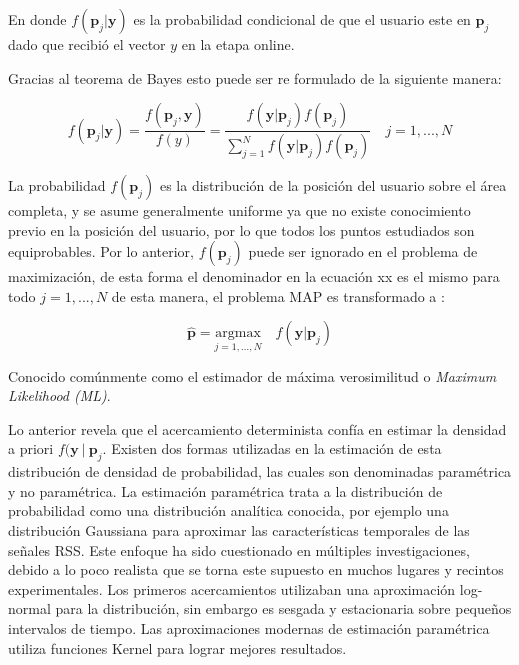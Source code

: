 \begin{enumerate}
 En donde \( f( \textbf{p}_{j} \vert \textbf{y}) \) es la probabilidad condicional de que el usuario este en \(\textbf{p}_{j}\) dado que recibió el vector \( y \) en la etapa online.
 
Gracias al teorema de Bayes esto puede ser re formulado de la siguiente manera:

\begin{equation}
 f( \textbf{p}_{j} \vert \textbf{y}) = \frac{f( \textbf{p}_{j} , \textbf{y})}{f(y)} = \frac{f( \textbf{y} \vert \textbf{p}_{j}) f(\textbf{p}_{j})} {\sum_{j=1}^{N} f( \textbf{y} \vert \textbf{p}_{j}) f(\textbf{p}_{j})} \quad j = 1, ..., N 
\end{equation}

La probabilidad \(f(\textbf{p}_{j})\) es la distribución de la posición del usuario sobre el área completa, y se asume generalmente uniforme ya que no existe conocimiento previo en la posición del usuario, por lo que todos los puntos estudiados son equiprobables. Por lo anterior, \(f(\textbf{p}_{j})\) puede ser ignorado en el problema de maximización, de esta forma el denominador en la ecuación xx es el mismo para todo \( j= 1, ..., N\) de esta manera, el problema MAP es transformado a :

\begin{equation}
\hat{\textbf{p}} = \underset{j=1,...,N}{\mathrm{argmax}} \quad f( \textbf{y}  \vert \textbf{p}_{j})
\end{equation}


Conocido comúnmente como el estimador de máxima verosimilitud o \textit{Maximum Likelihood (ML)}. 

Lo anterior revela que el acercamiento determinista confía en estimar la densidad a priori \(f( \textbf{y} \ \vert \ \textbf{p}_{j}\). Existen dos formas utilizadas en la estimación de esta distribución de densidad de probabilidad, las cuales son denominadas paramétrica y no paramétrica. La estimación paramétrica trata a la distribución de probabilidad como una distribución analítica conocida, por ejemplo una distribución Gaussiana \citep{Haeberlen:2004:PRL:1023720.1023728} para aproximar las características temporales de las señales RSS. Este enfoque ha sido cuestionado en múltiples investigaciones, debido a lo poco realista que se torna este supuesto en muchos lugares y recintos experimentales. Los primeros acercamientos utilizaban una aproximación log-normal para la distribución, sin embargo es sesgada y estacionaria sobre pequeños intervalos de tiempo.  Las aproximaciones modernas de estimación paramétrica utiliza funciones Kernel para lograr mejores resultados. 


\end{enumerate}
